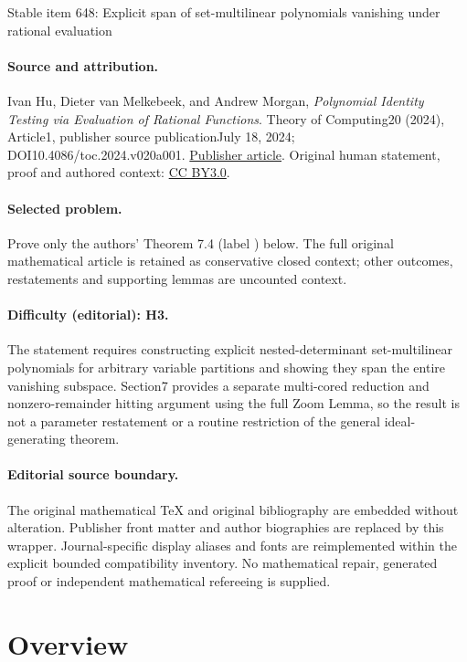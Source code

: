 \documentclass[11pt]{article}
\numberwithin{equation}{section}
\theoremstyle{definition}
\theoremstyle{plain}
\begin{document}
\begin{center}{\Large Stable item 648: Explicit span of set-multilinear polynomials vanishing under rational evaluation}\end{center}
\paragraph{Source and attribution.}
Ivan Hu, Dieter van Melkebeek, and Andrew Morgan, \emph{Polynomial Identity Testing via Evaluation of Rational Functions}. Theory of Computing20 (2024), Article1, publisher source publicationJuly 18, 2024; DOI10.4086/toc.2024.v020a001. \href{https://theoryofcomputing.org/articles/v020a001/}{Publisher article}. Original human statement, proof and authored context: \href{https://creativecommons.org/licenses/by/3.0/}{CC BY3.0}.
\paragraph{Selected problem.}
Prove only the authors' Theorem 7.4 (label ) below. The full original mathematical article is retained as conservative closed context; other outcomes, restatements and supporting lemmas are uncounted context.
\paragraph{Difficulty (editorial): H3.}
The statement requires constructing explicit nested-determinant set-multilinear polynomials for arbitrary variable partitions and showing they span the entire vanishing subspace. Section7 provides a separate multi-cored reduction and nonzero-remainder hitting argument using the full Zoom Lemma, so the result is not a parameter restatement or a routine restriction of the general ideal-generating theorem.
\paragraph{Editorial source boundary.}
The original mathematical TeX and original bibliography are embedded without alteration. Publisher front matter and author biographies are replaced by this wrapper. Journal-specific display aliases and fonts are reimplemented within the explicit bounded compatibility inventory. No mathematical repair, generated proof or independent mathematical refereeing is supplied.
\clearpage

%
%
%


%
%
%

\section{Overview}
\label{s.intro}
\end{document}
